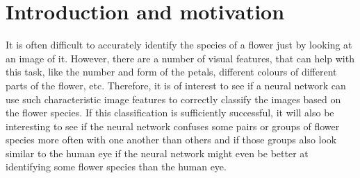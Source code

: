\section{Introduction and motivation}
\label{sec:motivation}
It is often difficult to accurately identify the species of a flower just by looking at an image of it. 
However, there are a number of visual features, that can help with this task, like the number and form of the petals, different colours of different parts of the flower, etc.
Therefore, it is of interest to see if a neural network can use such characteristic image features to correctly classify the images based on the flower species.
If this classification is sufficiently successful, it will also be interesting to see if the neural network confuses some pairs or groups of flower species more often with one another than others
and if those groups also look similar to the human eye if the neural network might even be better at identifying some flower species than the human eye.